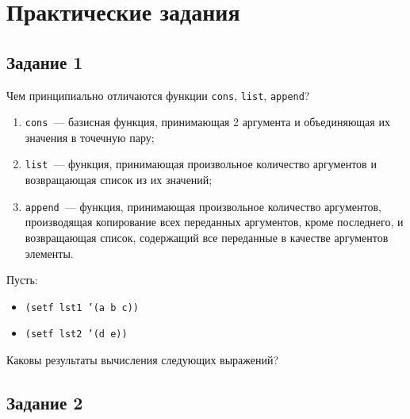 \chapter{Практические задания}

\section{Задание 1}

Чем принципиально отличаются функции \texttt{cons}, \texttt{list}, \texttt{append}?
\begin{enumerate}
	\item \texttt{cons}~--- базисная функция, принимающая 2 аргумента и объединяющая их значения в точечную пару;
	\item \texttt{list}~--- функция, принимающая произвольное количество аргументов и возвращающая список из их значений;
	\item \texttt{append}~--- функция, принимающая произвольное количество аргументов, производящая копирование всех переданных аргументов, кроме последнего, и возвращающая список, содержащий все переданные в качестве аргументов элементы.
\end{enumerate}

\noindent Пусть:
\begin{itemize}[label="", noitemsep]
	\item \texttt{(setf lst1 '(a b c))}
	\item \texttt{(setf lst2 '(d e))}
\end{itemize}
Каковы результаты вычисления следующих выражений?


\section{Задание 2}

